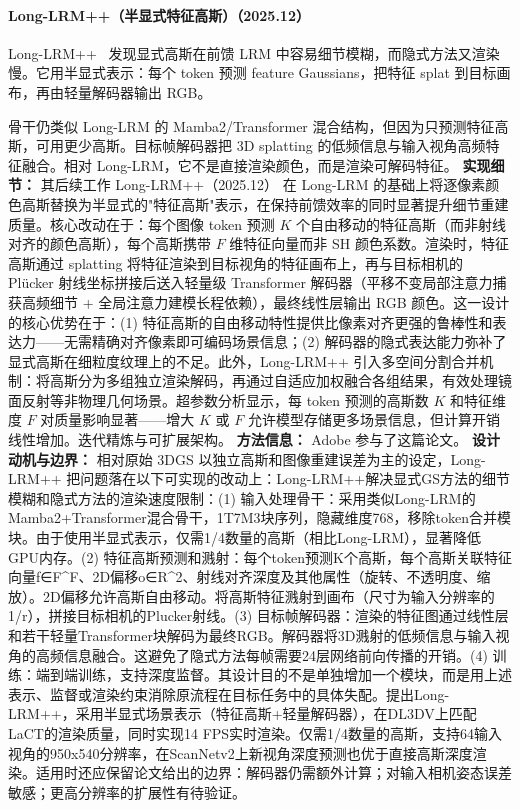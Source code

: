 \paragraph{Long-LRM++（半显式特征高斯）（2025.12）}
Long-LRM++~\cite{2512_10267} 发现显式高斯在前馈 LRM 中容易细节模糊，而隐式方法又渲染慢。它用半显式表示：每个 token 预测 feature Gaussians，把特征 splat 到目标画布，再由轻量解码器输出 RGB。

骨干仍类似 Long-LRM 的 Mamba2/Transformer 混合结构，但因为只预测特征高斯，可用更少高斯。目标帧解码器把 3D splatting 的低频信息与输入视角高频特征融合。相对 Long-LRM，它不是直接渲染颜色，而是渲染可解码特征。
\textbf{实现细节：} 其后续工作 Long-LRM++（2025.12） 在 Long-LRM 的基础上将逐像素颜色高斯替换为半显式的"特征高斯"表示，在保持前馈效率的同时显著提升细节重建质量。核心改动在于：每个图像 token 预测 $K$ 个自由移动的特征高斯（而非射线对齐的颜色高斯），每个高斯携带 $F$ 维特征向量而非 SH 颜色系数。渲染时，特征高斯通过 splatting 将特征渲染到目标视角的特征画布上，再与目标相机的 Pl\"ucker 射线坐标拼接后送入轻量级 Transformer 解码器（平移不变局部注意力捕获高频细节 + 全局注意力建模长程依赖），最终线性层输出 RGB 颜色。这一设计的核心优势在于：(1) 特征高斯的自由移动特性提供比像素对齐更强的鲁棒性和表达力——无需精确对齐像素即可编码场景信息；(2) 解码器的隐式表达能力弥补了显式高斯在细粒度纹理上的不足。此外，Long-LRM++ 引入多空间分割合并机制：将高斯分为多组独立渲染解码，再通过自适应加权融合各组结果，有效处理镜面反射等非物理几何场景。超参数分析显示，每 token 预测的高斯数 $K$ 和特征维度 $F$ 对质量影响显著——增大 $K$ 或 $F$ 允许模型存储更多场景信息，但计算开销线性增加。迭代精炼与可扩展架构。
\textbf{方法信息：} Adobe 参与了这篇论文。
\textbf{设计动机与边界：} 相对原始 3DGS 以独立高斯和图像重建误差为主的设定，Long-LRM++ 把问题落在以下可实现的改动上：Long-LRM++解决显式GS方法的细节模糊和隐式方法的渲染速度限制：(1) 输入处理骨干：采用类似Long-LRM的Mamba2+Transformer混合骨干，1T7M3块序列，隐藏维度768，移除token合并模块。由于使用半显式表示，仅需1/4数量的高斯（相比Long-LRM），显著降低GPU内存。(2) 特征高斯预测和溅射：每个token预测K个高斯，每个高斯关联特征向量f∈F\^{}F、2D偏移o∈R\^{}2、射线对齐深度及其他属性（旋转、不透明度、缩放）。2D偏移允许高斯自由移动。将高斯特征溅射到画布（尺寸为输入分辨率的1/r），拼接目标相机的Plucker射线。(3) 目标帧解码器：渲染的特征图通过线性层和若干轻量Transformer块解码为最终RGB。解码器将3D溅射的低频信息与输入视角的高频信息融合。这避免了隐式方法每帧需要24层网络前向传播的开销。(4) 训练：端到端训练，支持深度监督。其设计目的不是单独增加一个模块，而是用上述表示、监督或渲染约束消除原流程在目标任务中的具体失配。提出Long-LRM++，采用半显式场景表示（特征高斯+轻量解码器），在DL3DV上匹配LaCT的渲染质量，同时实现14 FPS实时渲染。仅需1/4数量的高斯，支持64输入视角的950x540分辨率，在ScanNetv2上新视角深度预测也优于直接高斯深度渲染。适用时还应保留论文给出的边界：解码器仍需额外计算；对输入相机姿态误差敏感；更高分辨率的扩展性有待验证。
